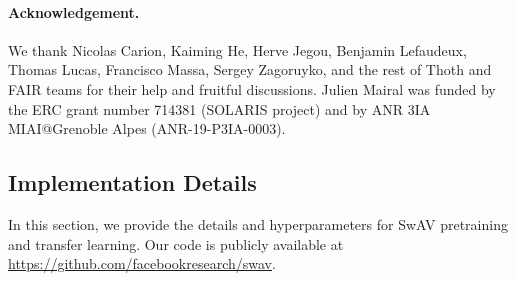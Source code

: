 \documentclass{article}
\def\OURS{SwAV\xspace}
\begin{document}
\paragraph{Acknowledgement.}
We thank Nicolas Carion, Kaiming He, Herve Jegou, Benjamin Lefaudeux, Thomas Lucas, Francisco Massa, Sergey Zagoruyko, and the rest of Thoth and FAIR teams for their help and fruitful discussions.
Julien Mairal was funded by the ERC grant number 714381 (SOLARIS project) and by ANR 3IA MIAI@Grenoble Alpes (ANR-19-P3IA-0003).





\newpage
\renewcommand{\thesubsection}{\Alph{subsection}}
\newcommand\tab[1][5mm]{\hspace*{#1}}


\subsection{Implementation Details}
\label{ap:implementation}
In this section, we provide the details and hyperparameters for \OURS pretraining and transfer learning.
Our code is publicly available at \url{https://github.com/facebookresearch/swav}.
\end{document}
